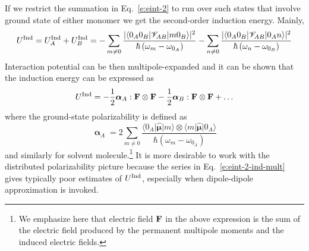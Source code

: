 \documentclass[a4paper,titlepage,twoside,fleqn,12pt]{book}
\newcommand{\BM}[1]{\bm{#1}}
\begin{document}
\begin{refsection}
If we restrict the summation in Eq.~\eqref{e:eint-2} to run over such states
that involve ground state of either monomer
we get the second\hyp{}order induction energy. Mainly,
%
\begin{equation} \label{e:eint-2-ind}
U^{\rm Ind} = U^{\rm Ind}_A + U^{\rm Ind}_B =
- \sum_{m\ne 0} \frac{
\lvert \langle 0_A0_B \lvert \mathscr{V}_{AB} \rvert m0_B \rangle \rvert^2
}{\hbar \left( \omega_{m} - \omega_{0_A}\right)}
%
- \sum_{n\ne 0} \frac{
\lvert \langle 0_A0_B \lvert \mathscr{V}_{AB} \rvert 0_An \rangle \rvert^2
}{\hbar \left( \omega_{n} - \omega_{0_B}\right)}
\end{equation}
%
Interaction potential can be then multipole\hyp{}expanded and
it can be shown that the induction energy
can be expressed as
%
\begin{equation} \label{e:eint-2-ind-mult}
U^{\rm Ind} = - \frac{1}{2} {\BM \alpha}_A : {\bf F} \otimes {\bf F} 
              - \frac{1}{2} {\BM \alpha}_B : {\bf F} \otimes {\bf F} + \ldots
\end{equation}
% 
where the ground\hyp{}state polarizability is defined as
%
\begin{equation} \label{e:polarizability}
{\BM \upalpha}_A = 2\sum_{m\neq 0} \frac{
\langle 0_A \lvert \hat{\BM \mu} \rvert m \rangle \otimes \langle m \lvert \hat{\BM \mu} \rvert 0_A \rangle 
}{\hbar \left( \omega_{m} - \omega_{0_A}\right)}
\end{equation}
%
and similarly for solvent molecule.\footnote{We emphasize here
that electric field $\bf F$ in the above expression
is the sum of the electric field produced by the permanent
multipole moments and the induced electric fields.}
It is more desirable to work with
the distributed polarizability picture because the series in 
Eq.~\eqref{e:eint-2-ind-mult} gives typically poor estimates of $U^{\rm Ind}$,
especially when dipole\hyp{}dipole approximation is invoked. 


\end{refsection}
\end{document}
